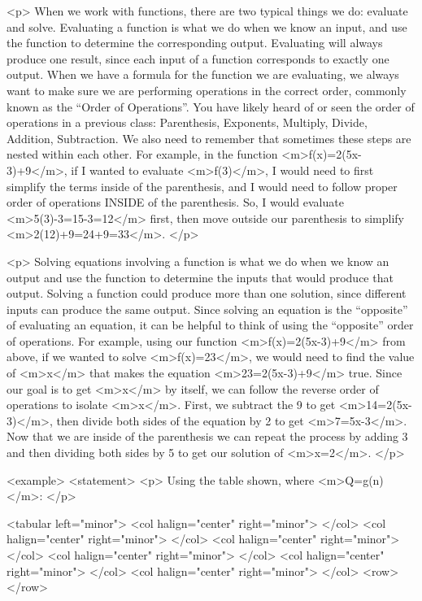         <p>
            When we work with functions, there are two typical things we do: evaluate and solve.
            Evaluating a function is what we do when we know an input, and use the function to determine the corresponding output.
            Evaluating will always produce one result, since each input of a function corresponds to exactly one output.
            When we have a formula for the function we are evaluating, we always want to make sure we are performing operations in the correct order, commonly known as the “Order of Operations”.
            You have likely heard of or seen the order of operations in a previous class: Parenthesis, Exponents, Multiply, Divide, Addition, Subtraction.
            We also need to remember that sometimes these steps are nested within each other.
            For example, in the function <m>f(x)=2(5x-3)+9</m>, if I wanted to evaluate <m>f(3)</m>, I would need to first simplify the terms inside of the parenthesis, and I would need to follow proper order of operations INSIDE of the parenthesis.
            So, I would evaluate <m>5(3)-3=15-3=12</m> first, then move outside our parenthesis to simplify <m>2(12)+9=24+9=33</m>.
        </p>

        <p>
            Solving equations involving a function is what we do when we know an output and use the function to determine the inputs that would produce that output.
            Solving a function could produce more than one solution, since different inputs can produce the same output.
            Since solving an equation is the “opposite” of evaluating an equation, it can be helpful to think of using the “opposite” order of operations.
            For example, using our function <m>f(x)=2(5x-3)+9</m> from above, if we wanted to solve <m>f(x)=23</m>, we would need to find the value of <m>x</m> that makes the equation <m>23=2(5x-3)+9</m> true.
            Since our goal is to get <m>x</m> by itself, we can follow the reverse order of operations to isolate <m>x</m>.
            First, we subtract the 9 to get <m>14=2(5x-3)</m>, then divide both sides of the equation by 2 to get <m>7=5x-3</m>.
            Now that we are inside of the parenthesis we can repeat the process by adding 3 and then dividing both sides by 5 to get our solution of <m>x=2</m>.
        </p>

        <example>
            <statement>
                <p>
                    Using the table shown, where <m>Q=g(n)</m>:
                </p>

                <tabular left="minor">
                    <col halign="center" right="minor"> </col> <col halign="center" right="minor"> </col> <col halign="center" right="minor"> </col> <col halign="center" right="minor"> </col> <col halign="center" right="minor"> </col> <col halign="center" right="minor"> </col>
                    <row>
                    </row>

